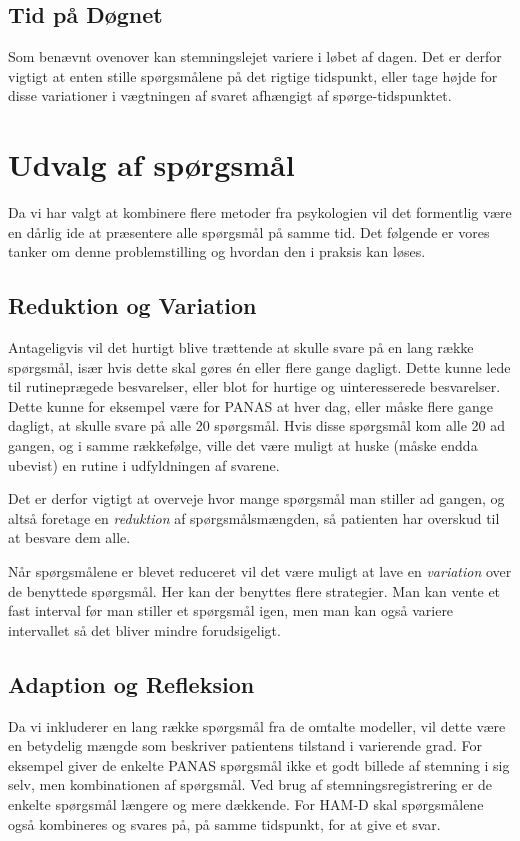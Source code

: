 \subsection{Tid på Døgnet}
Som benævnt ovenover kan stemningslejet variere i løbet af dagen.
Det er derfor vigtigt at enten stille spørgsmålene på det rigtige tidspunkt, eller tage højde for disse variationer i vægtningen af svaret afhængigt af spørge-tidspunktet.
\section{Udvalg af spørgsmål}\label{4_magiske_ord}
Da vi har valgt at kombinere flere metoder fra psykologien vil det formentlig være en dårlig ide at præsentere alle spørgsmål på samme tid.
Det følgende er vores tanker om denne problemstilling og hvordan den i praksis kan løses.

\subsection{Reduktion og Variation}
Antageligvis vil det hurtigt blive trættende at skulle svare på en lang række spørgsmål, især hvis dette skal gøres én eller flere gange dagligt.
Dette kunne lede til rutineprægede besvarelser, eller blot for hurtige og uinteresserede besvarelser.
Dette kunne for eksempel være for PANAS at hver dag, eller måske flere gange dagligt, at skulle svare på alle 20 spørgsmål.
Hvis disse spørgsmål kom alle 20 ad gangen, og i samme rækkefølge, ville det være muligt at huske (måske endda ubevist) en rutine i udfyldningen af svarene.

Det er derfor vigtigt at overveje hvor mange spørgsmål man stiller ad gangen, og altså foretage en \emph{reduktion} af spørgsmålsmængden, så patienten har overskud til at besvare dem alle.

Når spørgsmålene er blevet reduceret vil det være muligt at lave en \emph{variation} over de benyttede spørgsmål.
Her kan der benyttes flere strategier.
Man kan vente et fast interval før man stiller et spørgsmål igen, men man kan også variere intervallet så det bliver mindre forudsigeligt.

\subsection{Adaption og Refleksion}
Da vi inkluderer en lang række spørgsmål fra de omtalte modeller, vil dette være en betydelig mængde som beskriver patientens tilstand i varierende grad.
For eksempel giver de enkelte PANAS spørgsmål ikke et godt billede af stemning i sig selv, men kombinationen af spørgsmål.
Ved brug af stemningsregistrering er de enkelte spørgsmål længere og mere dækkende.
For HAM-D skal spørgsmålene også kombineres og svares på, på samme tidspunkt, for at give et svar.

